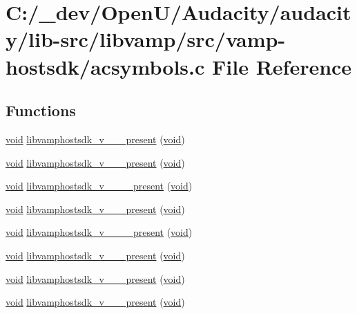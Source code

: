 \hypertarget{vamp-hostsdk_2acsymbols_8c}{}\section{C\+:/\+\_\+dev/\+Open\+U/\+Audacity/audacity/lib-\/src/libvamp/src/vamp-\/hostsdk/acsymbols.c File Reference}
\label{vamp-hostsdk_2acsymbols_8c}
\subsection*{Functions}
\begin{DoxyCompactItemize}
\item 
\hyperlink{sound_8c_ae35f5844602719cf66324f4de2a658b3}{void} \hyperlink{vamp-hostsdk_2acsymbols_8c_a2a3c3273348f6c29dcdfcd1c470529b6}{libvamphostsdk\+\_\+v\+\_\+\_\+\_\+present} (\hyperlink{sound_8c_ae35f5844602719cf66324f4de2a658b3}{void})
\item 
\hyperlink{sound_8c_ae35f5844602719cf66324f4de2a658b3}{void} \hyperlink{vamp-hostsdk_2acsymbols_8c_a7aa2f1245209bff4afb61ce798c2b844}{libvamphostsdk\+\_\+v\+\_\+\_\+\_\+present} (\hyperlink{sound_8c_ae35f5844602719cf66324f4de2a658b3}{void})
\item 
\hyperlink{sound_8c_ae35f5844602719cf66324f4de2a658b3}{void} \hyperlink{vamp-hostsdk_2acsymbols_8c_ab7ee47a4699ee18b6007dbf9d69a37d6}{libvamphostsdk\+\_\+v\+\_\+\_\+\_\+\_\+present} (\hyperlink{sound_8c_ae35f5844602719cf66324f4de2a658b3}{void})
\item 
\hyperlink{sound_8c_ae35f5844602719cf66324f4de2a658b3}{void} \hyperlink{vamp-hostsdk_2acsymbols_8c_a9c7f3f24e034e6ecff8e6182d584d007}{libvamphostsdk\+\_\+v\+\_\+\_\+\_\+present} (\hyperlink{sound_8c_ae35f5844602719cf66324f4de2a658b3}{void})
\item 
\hyperlink{sound_8c_ae35f5844602719cf66324f4de2a658b3}{void} \hyperlink{vamp-hostsdk_2acsymbols_8c_af083a89983ca84084e3d6e11a116bb1d}{libvamphostsdk\+\_\+v\+\_\+\_\+\_\+\_\+present} (\hyperlink{sound_8c_ae35f5844602719cf66324f4de2a658b3}{void})
\item 
\hyperlink{sound_8c_ae35f5844602719cf66324f4de2a658b3}{void} \hyperlink{vamp-hostsdk_2acsymbols_8c_a6dd82029c8878352ce39dfef3ce56b13}{libvamphostsdk\+\_\+v\+\_\+\_\+\_\+present} (\hyperlink{sound_8c_ae35f5844602719cf66324f4de2a658b3}{void})
\item 
\hyperlink{sound_8c_ae35f5844602719cf66324f4de2a658b3}{void} \hyperlink{vamp-hostsdk_2acsymbols_8c_ac8b85bf3f56bfecba7567c8ce4f1e799}{libvamphostsdk\+\_\+v\+\_\+\_\+\_\+present} (\hyperlink{sound_8c_ae35f5844602719cf66324f4de2a658b3}{void})
\item 
\hyperlink{sound_8c_ae35f5844602719cf66324f4de2a658b3}{void} \hyperlink{vamp-hostsdk_2acsymbols_8c_af0a09b7664ac2bff9df24c2d3e3144ab}{libvamphostsdk\+\_\+v\+\_\+\_\+\_\+present} (\hyperlink{sound_8c_ae35f5844602719cf66324f4de2a658b3}{void})
\end{DoxyCompactItemize}


